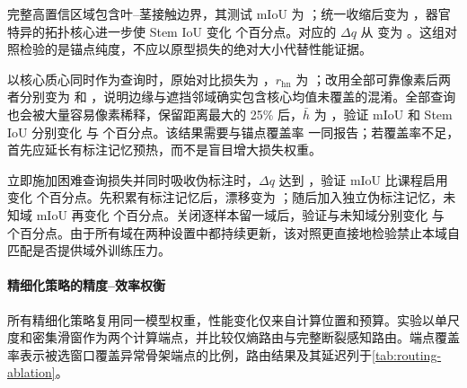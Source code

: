 完整高置信区域包含叶--茎接触边界，其测试 mIoU 为 ；统一收缩后变为 ，器官特异的拓扑核心进一步使 Stem IoU 变化  个百分点。对应的 $\Delta q$ 从  变为 。这组对照检验的是锚点纯度，不应以原型损失的绝对大小代替性能证据。

以核心质心同时作为查询时，原始对比损失为 ，$r_{\mathrm{hn}}$ 为 ；改用全部可靠像素后两者分别变为  和 ，说明边缘与遮挡邻域确实包含核心均值未覆盖的混淆。全部查询也会被大量容易像素稀释，保留距离最大的 25\% 后，$\bar h$ 为 ，验证 mIoU 和 Stem IoU 分别变化  与  个百分点。该结果需要与锚点覆盖率  一同报告；若覆盖率不足，首先应延长有标注记忆预热，而不是盲目增大损失权重。

立即施加困难查询损失并同时吸收伪标注时，$\Delta q$ 达到 ，验证 mIoU 比课程启用变化  个百分点。先积累有标注记忆后，漂移变为 ；随后加入独立伪标注记忆，未知域 mIoU 再变化  个百分点。关闭逐样本留一域后，验证与未知域分别变化  与  个百分点。由于所有域在两种设置中都持续更新，该对照更直接地检验禁止本域自匹配是否提供域外训练压力。

\paragraph{精细化策略的精度--效率权衡}
所有精细化策略复用同一模型权重，性能变化仅来自计算位置和预算。实验以单尺度和密集滑窗作为两个计算端点，并比较仅熵路由与完整断裂感知路由。端点覆盖率表示被选窗口覆盖异常骨架端点的比例，路由结果及其延迟列于\cref{tab:routing-ablation}。

\begin{table}[!htbp]
\centering
\caption{局部精细化策略的精度--效率比较。端点覆盖率和分割指标以百分数表示，延迟包含窗口评分、裁剪和融合。}
\label{tab:routing-ablation}
\end{table}

